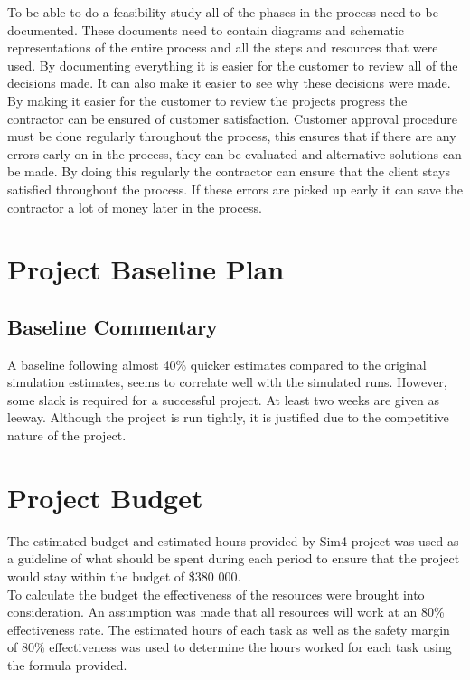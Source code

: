 \noindent
To be able to do a feasibility study all of the phases in the process need to be documented. These documents need to contain diagrams and schematic representations of the entire process and all the steps and resources that were used. By documenting everything it is easier for the customer to review all of the decisions made. It can also make it easier to see why these decisions were made. By making it easier for the customer to review the projects progress the contractor can be ensured of customer satisfaction. Customer approval procedure must be done regularly throughout the process, this ensures that if there are any errors early on in the process, they can be evaluated and alternative solutions can be made. By doing this regularly the contractor can ensure that the client stays satisfied throughout the process. If these errors are picked up early it can save the contractor a lot of money later in the process.

\newpage
\section{Project Baseline Plan}
\subsection{Baseline Commentary}

A baseline following almost 40\% quicker estimates compared to the original simulation estimates, seems to correlate well with the simulated runs. However, some slack is required for a successful project. At least two weeks are given as leeway. Although the project is run tightly, it is justified due to the competitive nature of the project.\\

\section{Project Budget}

The estimated budget and estimated hours provided by Sim4 project was used as a guideline of what should be spent during each period to ensure that the project would stay within the budget of \$380 000.\\

\noindent
To calculate the budget the effectiveness of the resources were brought into consideration. An assumption was made that all resources will work at an 80\% effectiveness rate. The estimated hours of each task as well as the safety margin of 80\% effectiveness was used to determine the hours worked for each task using the formula provided.


